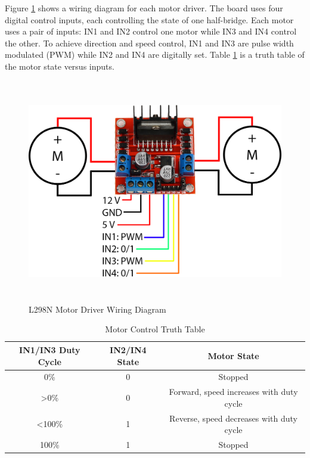Figure \ref{fig:l298n} shows a wiring diagram for each motor driver. The board uses four digital control inputs, each controlling the state of one half-bridge. Each motor uses a pair of inputs: IN1 and IN2 control one motor while IN3 and IN4 control the other. To achieve direction and speed control, IN1 and IN3 are pulse width modulated (PWM) while IN2 and IN4 are digitally set. Table \ref{tab:L298N_truth_table} is a truth table of the motor state versus inputs.
\begin{figure}[H]   %
	\centering \includegraphics[width=6in, height=3.85in, keepaspectratio]{figures/l298n.png}
	\caption{L298N Motor Driver Wiring Diagram \cite{l298n}}\label{fig:l298n}
\end{figure}
\begin{table}[h]
	\centering \caption{Motor Control Truth Table}	\label{tab:L298N_truth_table}
	\begin{tabular}{ccc}
		\toprule 
		IN1/IN3 Duty Cycle & IN2/IN4 State & Motor State \\ 
		\midrule 
		0\% & 0 & Stopped \\ 
		\textgreater 0\% & 0 & Forward, speed increases with duty cycle \\ 
		\textless 100\% & 1 & Reverse, speed decreases with duty cycle \\ 
		100\% & 1 & Stopped \\ 
		\bottomrule
	\end{tabular} 
\end{table}

